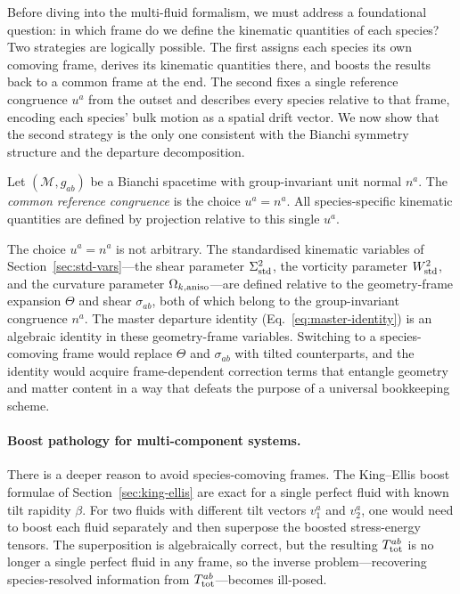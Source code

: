 Before diving into the multi-fluid formalism, we must address
a foundational question: in which frame do we define the
kinematic quantities of each species?  Two strategies are
logically possible.  The first assigns each species its own
comoving frame, derives its kinematic quantities there, and
boosts the results back to a common frame at the end.  The
second fixes a single reference congruence $u^a$ from the
outset and describes every species relative to that frame,
encoding each species' bulk motion as a spatial drift vector.
We now show that the second strategy is the only one
consistent with the Bianchi symmetry structure and the
departure decomposition.

\begin{definition}
\label{def:common-frame}
Let $(\mathcal{M}, g_{ab})$ be a Bianchi spacetime with
group-invariant unit normal $n^a$.  The \emph{common reference
congruence} is the choice $u^a = n^a$.  All species-specific
kinematic quantities are defined by projection relative to
this single $u^a$.
\end{definition}

The choice $u^a = n^a$ is not arbitrary.  The standardised
kinematic variables of Section~\ref{sec:std-vars}---the
shear parameter $\Sigma^2_{\mathrm{std}}$, the vorticity parameter $W^2_{\mathrm{std}}$,
and the curvature parameter $\Omega_{k,\mathrm{aniso}}$---are defined relative
to the geometry-frame expansion $\Theta$ and shear
$\sigma_{ab}$, both of which belong to the group-invariant
congruence $n^a$.  The master departure identity
(Eq.~\ref{eq:master-identity}) is an algebraic identity in
these geometry-frame variables.  Switching to a
species-comoving frame would replace $\Theta$ and
$\sigma_{ab}$ with tilted counterparts, and the identity
would acquire frame-dependent correction terms that entangle
geometry and matter content in a way that defeats the purpose
of a universal bookkeeping scheme.


\paragraph{Boost pathology for multi-component systems.}

There is a deeper reason to avoid species-comoving frames.
The King--Ellis boost formulae of
Section~\ref{sec:king-ellis} are exact for a single perfect
fluid with known tilt rapidity $\beta$.  For two fluids with
different tilt vectors $v_1^a$ and $v_2^a$, one would need to
boost each fluid separately and then superpose the boosted
stress-energy tensors.  The superposition is algebraically
correct, but the resulting $T^{ab}_{\rm tot}$ is no longer a
single perfect fluid in any frame, so the inverse
problem---recovering species-resolved information from
$T^{ab}_{\rm tot}$---becomes ill-posed.

